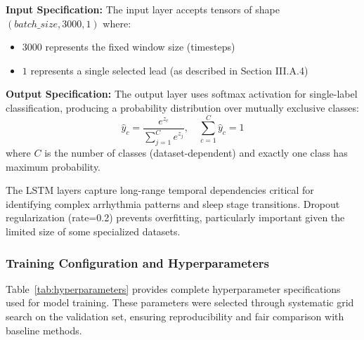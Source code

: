 \documentclass[conference]{IEEEtran}
\begin{document}
\textbf{Input Specification:} The input layer accepts tensors of shape $(batch\_size, 3000, 1)$ where:
\begin{itemize}
\item $3000$ represents the fixed window size (timesteps)
\item $1$ represents a single selected lead (as described in Section III.A.4)
\end{itemize}

\textbf{Output Specification:} The output layer uses softmax activation for single-label classification, producing a probability distribution over mutually exclusive classes:
\begin{equation}
\hat{y}_c = \frac{e^{z_c}}{\sum_{j=1}^{C} e^{z_j}}, \quad \sum_{c=1}^{C} \hat{y}_c = 1
\end{equation}
where $C$ is the number of classes (dataset-dependent) and exactly one class has maximum probability.

The LSTM layers capture long-range temporal dependencies critical for identifying complex arrhythmia patterns and sleep stage transitions. Dropout regularization (rate=0.2) prevents overfitting, particularly important given the limited size of some specialized datasets.

\subsubsection{Training Configuration and Hyperparameters}

Table~\ref{tab:hyperparameters} provides complete hyperparameter specifications used for model training. These parameters were selected through systematic grid search on the validation set, ensuring reproducibility and fair comparison with baseline methods.
\end{document}
